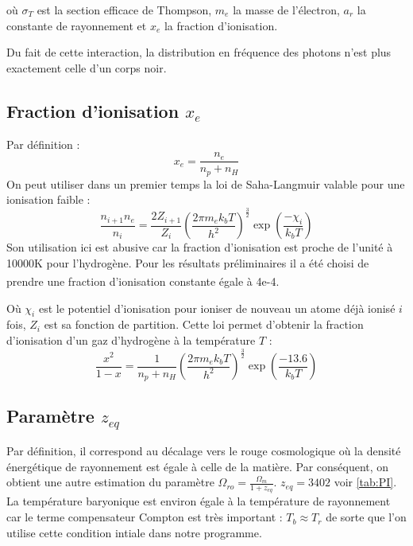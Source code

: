 \documentclass[10pt, a4paper]{report}
\numberwithin{equation}{subsection}
\begin{document}
 où $\sigma_T$ est la section efficace de Thompson, $m_e$ la masse de l'électron, $a_r$ la constante de rayonnement et $x_e$ la fraction d'ionisation.

Du fait de cette interaction, la distribution en fréquence des photons n'est plus exactement celle d'un corps noir.   
 
\subsection{Fraction d'ionisation $x_e$}
Par définition :
\begin{equation} \label{eq:XE}
\boxed{x_e= \frac{n_e}{n_p+n_H}}
\end{equation}
On peut utiliser dans un premier temps la loi de Saha-Langmuir valable pour une ionisation faible :
\begin{equation} \label{eq:XESL}
\boxed{\frac{n_{i+1} n_e }{n_i} = \frac{2 Z_{i+1}}{Z_i} \left( \frac{2\pi m_ek_bT}{h^2}\right)^{\frac{3}{2}} \exp(\frac{-\chi_i}{k_bT})}
\end{equation}
Son utilisation ici est abusive car la fraction d'ionisation est proche de l'unité à 10000K pour l'hydrogène. Pour les résultats préliminaires il a été choisi de prendre une fraction d'ionisation constante égale à 4e-4\textsuperscript{\cite{Flower}}.

Où $\chi_i$ est le potentiel d'ionisation pour ioniser de nouveau un atome déjà ionisé $i$ fois, $Z_i$ est sa fonction de partition. Cette loi permet d'obtenir la fraction d'ionisation d'un gaz d'hydrogène à la température $T$ :
\begin{equation} \label{eq:XE}
\boxed{\frac{x^2}{1-x} = \frac{1}{n_p+n_H} \left( \frac{2\pi m_ek_bT}{h^2}\right)^{\frac{3}{2}} \exp(\frac{-13.6}{k_bT})}
\end{equation}

\subsection{Paramètre $z_{eq}$}
Par définition, il correspond au décalage vers le rouge cosmologique où la densité énergétique de rayonnement est égale à celle de la matière. Par conséquent, on obtient une autre estimation du paramètre $\Omega_{ro} = \frac{\Omega_{m}}{1+z_{eq}}$. $z_{eq} = 3402$ voir \ref{tab:PI}. La température baryonique est environ égale à la température de rayonnement car le terme compensateur Compton est très important : $T_b \approx T_r$ de sorte que l'on utilise cette condition intiale dans notre programme.
\end{document}
